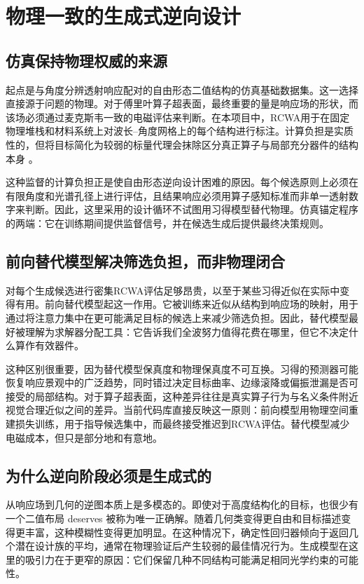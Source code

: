 \section{物理一致的生成式逆向设计}

\subsection{仿真保持物理权威的来源}

起点是与角度分辨透射响应配对的自由形态二值结构的仿真基础数据集。这一选择直接源于问题的物理。对于傅里叶算子超表面，最终重要的量是响应场的形状，而该场必须通过麦克斯韦一致的电磁评估来判断。在本项目中，RCWA用于在固定物理堆栈和材料系统上对波长--角度网格上的每个结构进行标注。计算负担是实质性的，但将目标简化为较弱的标量代理会抹除区分真正算子与局部充分器件的结构本身 \cite{moharam1981,moharam1995}。

这种监督的计算负担正是使自由形态逆向设计困难的原因。每个候选原则上必须在有限角度和光谱孔径上进行评估，且结果响应必须用算子感知标准而非单一透射数字来判断。因此，这里采用的设计循环不试图用习得模型替代物理。仿真锚定程序的两端：它在训练期间提供监督信号，并在候选生成后提供最终决策规则。

\subsection{前向替代模型解决筛选负担，而非物理闭合}

对每个生成候选进行密集RCWA评估足够昂贵，以至于某些习得近似在实际中变得有用。前向替代模型起这一作用。它被训练来近似从结构到响应场的映射，用于通过将注意力集中在更可能满足目标的候选上来减少筛选负担。因此，替代模型最好被理解为求解器分配工具：它告诉我们全波努力值得花费在哪里，但它不决定什么算作有效器件。

这种区别很重要，因为替代模型保真度和物理保真度不可互换。习得的预测器可能恢复响应景观中的广泛趋势，同时错过决定目标曲率、边缘滚降或偏振泄漏是否可接受的局部结构。对于算子超表面，这种差异往往是真实算子行为与名义条件附近视觉合理近似之间的差异。当前代码库直接反映这一原则：前向模型用物理空间重建损失训练，用于指导候选集中，而最终接受推迟到RCWA评估。替代模型减少电磁成本，但只是部分地和有意地。

\subsection{为什么逆向阶段必须是生成式的}

从响应场到几何的逆图本质上是多模态的。即使对于高度结构化的目标，也很少有一个二值布局 deserves 被称为唯一正确解。随着几何类变得更自由和目标描述变得更丰富，这种模糊性变得更加明显。在这种情况下，确定性回归器倾向于返回几个潜在设计族的平均，通常在物理验证后产生较弱的最佳情况行为。生成模型在这里的吸引力在于更窄的原因：它们保留几种不同结构可能满足相同光学约束的可能性。

